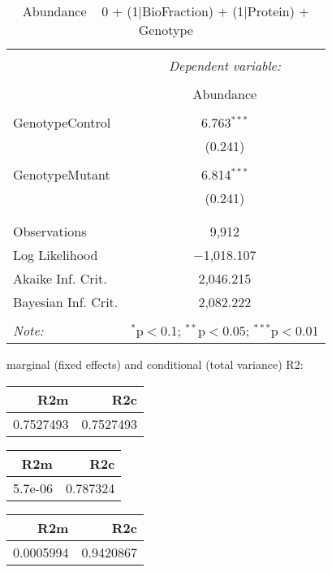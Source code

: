 \documentclass[11pt]{report}
\begin{document}
\begin{table}[!htbp] \centering 
  \caption{Abundance ~ 0 + (1|BioFraction) + (1|Protein) + Genotype} 
  \label{} 
\begin{tabular}{@{\extracolsep{5pt}}lc} 
\\[-1.8ex]\hline 
\hline \\[-1.8ex] 
 & \multicolumn{1}{c}{\textit{Dependent variable:}} \\ 
\cline{2-2} 
\\[-1.8ex] & Abundance \\ 
\hline \\[-1.8ex] 
 GenotypeControl & 6.763$^{***}$ \\ 
  & (0.241) \\ 
  & \\ 
 GenotypeMutant & 6.814$^{***}$ \\ 
  & (0.241) \\ 
  & \\ 
\hline \\[-1.8ex] 
Observations & 9,912 \\ 
Log Likelihood & $-$1,018.107 \\ 
Akaike Inf. Crit. & 2,046.215 \\ 
Bayesian Inf. Crit. & 2,082.222 \\ 
\hline 
\hline \\[-1.8ex] 
\textit{Note:}  & \multicolumn{1}{r}{$^{*}$p$<$0.1; $^{**}$p$<$0.05; $^{***}$p$<$0.01} \\ 
\end{tabular} 
\end{table} 
marginal (fixed effects) and conditional (total variance) R2:

\begin{tabular}{r|r}
\hline
R2m & R2c\\
\hline
0.7527493 & 0.7527493\\
\hline
\end{tabular}

\begin{tabular}{r|r}
\hline
R2m & R2c\\
\hline
5.7e-06 & 0.787324\\
\hline
\end{tabular}

\begin{tabular}{r|r}
\hline
R2m & R2c\\
\hline
0.0005994 & 0.9420867\\
\hline
\end{tabular}
\end{document}
